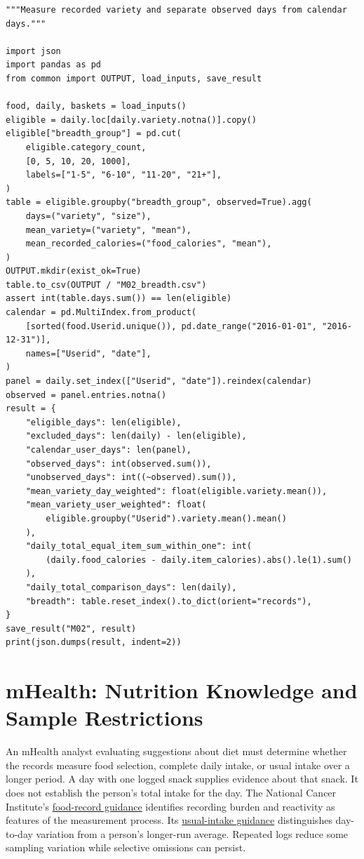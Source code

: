 \begin{Verbatim}[breaklines,breakanywhere,fontsize=\small]
"""Measure recorded variety and separate observed days from calendar days."""

import json
import pandas as pd
from common import OUTPUT, load_inputs, save_result

food, daily, baskets = load_inputs()
eligible = daily.loc[daily.variety.notna()].copy()
eligible["breadth_group"] = pd.cut(
    eligible.category_count,
    [0, 5, 10, 20, 1000],
    labels=["1-5", "6-10", "11-20", "21+"],
)
table = eligible.groupby("breadth_group", observed=True).agg(
    days=("variety", "size"),
    mean_variety=("variety", "mean"),
    mean_recorded_calories=("food_calories", "mean"),
)
OUTPUT.mkdir(exist_ok=True)
table.to_csv(OUTPUT / "M02_breadth.csv")
assert int(table.days.sum()) == len(eligible)
calendar = pd.MultiIndex.from_product(
    [sorted(food.Userid.unique()), pd.date_range("2016-01-01", "2016-12-31")],
    names=["Userid", "date"],
)
panel = daily.set_index(["Userid", "date"]).reindex(calendar)
observed = panel.entries.notna()
result = {
    "eligible_days": len(eligible),
    "excluded_days": len(daily) - len(eligible),
    "calendar_user_days": len(panel),
    "observed_days": int(observed.sum()),
    "unobserved_days": int((~observed).sum()),
    "mean_variety_day_weighted": float(eligible.variety.mean()),
    "mean_variety_user_weighted": float(
        eligible.groupby("Userid").variety.mean().mean()
    ),
    "daily_total_equal_item_sum_within_one": int(
        (daily.food_calories - daily.item_calories).abs().le(1).sum()
    ),
    "daily_total_comparison_days": len(daily),
    "breadth": table.reset_index().to_dict(orient="records"),
}
save_result("M02", result)
print(json.dumps(result, indent=2))
\end{Verbatim}

\hypertarget{M02-mhealth-nutrition-knowledge-and-sample-restrictions}{%
\section{mHealth: Nutrition Knowledge and Sample
Restrictions}\label{M02-mhealth-nutrition-knowledge-and-sample-restrictions}}

\noindent An mHealth analyst evaluating suggestions about diet must determine
whether the records measure food selection, complete daily intake, or
usual intake over a longer period. A day with one logged snack supplies
evidence about that snack. It does not establish the person's total
intake for the day. The National Cancer Institute's
\href{https://epi.grants.cancer.gov/dietary-assessment-primer/profiles/record/}{food-record
guidance} identifies recording burden and reactivity as features of the
measurement process. Its
\href{https://epi.grants.cancer.gov/dietary-assessment-primer/learn/usual.html}{usual-intake
guidance} distinguishes day-to-day variation from a person's longer-run
average. Repeated logs reduce some sampling variation while selective
omissions can persist.

